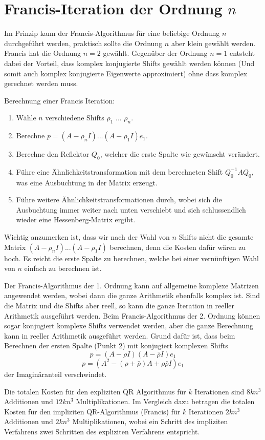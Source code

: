 \section{Francis-Iteration der Ordnung $n$}
Im Prinzip kann der Francis-Algorithmus für eine beliebige Ordnung $n$ durchgeführt werden, praktisch sollte die Ordnung $n$ aber klein gewählt werden.
Francis hat die Ordnung $n=2$ gewählt.
Gegenüber der Ordnung $n=1$ entsteht dabei der Vorteil, dass komplex konjugierte Shifts gewählt werden können (Und somit auch komplex konjugierte Eigenwerte approximiert) ohne dass komplex gerechnet werden muss.

Berechnung einer Francis Iteration:
\begin{enumerate}
	\item Wähle $n$ verschiedene Shifts $\rho_{1}$ ... $\rho_{n}$.
	\item Berechne $p= (A - \rho_{n}I) ... (A - \rho_{1}I)e_{1}$.
	\item Berechne den Reflektor $Q_{0}$, welcher die erste Spalte wie gewünscht verändert.
	\item Führe eine Ähnlichkeitstransformation mit dem berechneten Shift $Q_{0}^{-1}AQ_{0}$, was eine Ausbuchtung in der Matrix erzeugt.
	\item Führe weitere Ähnlichkeitstransformationen durch, wobei sich die Ausbuchtung immer weiter nach unten verschiebt und sich schlussendlich wieder eine Hessenberg-Matrix ergibt.
\end{enumerate}

Wichtig anzumerken ist, dass wir nach der Wahl von $n$ Shifts nicht die gesamte Matrix $(A - \rho_{n}I) ... (A - \rho_{1}I)$ berechnen, denn die Kosten dafür wären zu hoch. Es reicht die erste Spalte zu berechnen, welche bei einer vernünftigen Wahl von $n$ einfach zu berechnen ist.

Der Francis-Algorithmus der 1. Ordnung kann auf allgemeine komplexe Matrizen angewendet werden, wobei dann die ganze Arithmetik ebenfalls komplex ist.
Sind die Matrix und die Shifts aber reell, so kann die ganze Iteration in reeller Arithmetik ausgeführt werden.
Beim Francis-Algorithmus der 2. Ordnung können sogar konjugiert komplexe Shifts verwendet werden, aber die ganze Berechnung kann in reeller Arithmetik ausgeführt werden. Grund dafür ist, dass beim Berechnen der ersten Spalte (Punkt 2) mit konjugiert komplexen Shifts
\begin{equation}
p= (A - \rho I)(A - \bar{\rho} I)e_{1}
\end{equation}
\begin{equation}
p= (A^2-(\rho+\bar{\rho})A+\rho\bar{\rho}I)e_{1}
\end{equation}
der Imaginäranteil verschwindet.

Die totalen Kosten für den expliziten QR Algorithmus für $k$ Iterationen sind $8kn^{3}$ Additionen und $12kn^{3}$ Multiplikationen.
Im Vergleich dazu betragen die totalen Kosten für den impliziten QR-Algorithmus (Francis) für $k$ Iterationen $2kn^{3}$ Additionen und $2kn^{3}$ Multiplikationen, wobei ein Schritt des impliziten Verfahrens zwei Schritten des expliziten Verfahrens entspricht. \cite{francis:EthSeminar}

